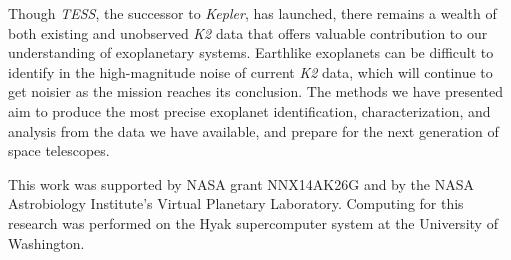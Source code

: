 \documentclass[12pt,preprint]{aastex}
\begin{document}
Though \textit{TESS}, the successor to \textit{Kepler}, has launched, there remains a wealth of both existing and unobserved \textit{K2} data that offers valuable contribution to our understanding of exoplanetary systems. Earthlike exoplanets can be difficult to identify in the high-magnitude noise of current \textit{K2} data, which will continue to get noisier as the mission reaches its conclusion. The methods we have presented aim to produce the most precise exoplanet identification, characterization, and analysis from the data we have available, and prepare for the next generation of space telescopes.

This work was supported by NASA grant NNX14AK26G and by the NASA Astrobiology Institute's Virtual Planetary Laboratory. Computing for this research was performed on the Hyak supercomputer system at the University of Washington.

\clearpage


\end{document}

